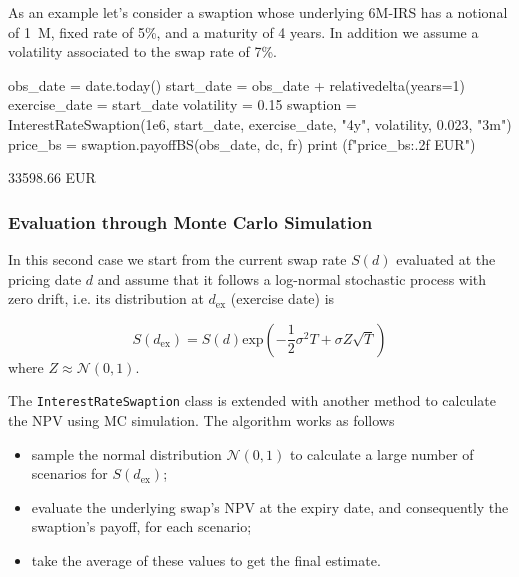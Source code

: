 As an example let's consider a swaption whose underlying 6M-IRS has a notional of 1~M, fixed rate of 5\%, and a maturity of 4 years. In addition we assume a volatility associated to the swap rate of 7\%.

\begin{ipython}
obs_date = date.today()
start_date = obs_date + relativedelta(years=1)
exercise_date = start_date
volatility = 0.15
swaption = InterestRateSwaption(1e6, start_date, exercise_date, "4y",
                                volatility, 0.023, "3m")
price_bs = swaption.payoffBS(obs_date, dc, fr)
print (f"{price_bs:.2f} EUR")
\end{ipython}
\begin{ioutput}
33598.66 EUR
\end{ioutput}

\subsubsection{Evaluation through Monte Carlo Simulation}
\label{evaluation-through-monte-carlo-simulation}

In this second case we start from the current swap rate $S(d)$ evaluated at the pricing date $d$ and assume that it follows a log-normal stochastic process with zero drift, i.e. its distribution at $d_{\mathrm{ex}}$ (exercise date) is 

\begin{equation*}
S(d_{\mathrm{ex}}) = S(d)\mathrm{exp}(-\frac{1}{2}\sigma^{2}T+\sigma Z\sqrt{T})
\end{equation*}
\noindent
where $Z\approx\mathcal{N}(0,1)$. %

\begin{finmarkets}
The \texttt{InterestRateSwaption} class is extended with another method to calculate the NPV using MC simulation.
The algorithm works as follows

\begin{itemize}
\tightlist
\item sample the normal distribution $\mathcal{N}(0, 1)$ to calculate a large number of scenarios for $S(d_{\mathrm{ex}})$;
\item evaluate the underlying swap's NPV at the expiry date, and consequently the swaption's payoff, for each scenario;
\item take the average of these values to get the final estimate.
\end{itemize}
\end{finmarkets}


